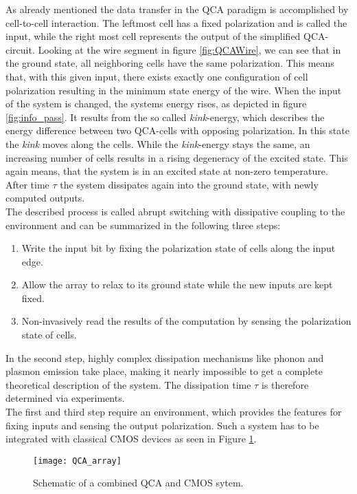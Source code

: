 As already mentioned the data transfer in the QCA paradigm is accomplished by cell-to-cell interaction. The leftmost cell has a fixed polarization and is called the input, while the right most cell represents the output of the simplified  QCA-circuit. Looking at the wire segment in figure \ref{fig:QCAWire}, we can see that in the ground state, all neighboring cells have the same polarization. This means that, with this given input, there exists exactly one configuration of cell polarization resulting in the minimum state energy of the wire. When the input of the system is changed, the systems energy rises, as depicted in figure \ref{fig:info_pass}. It results from the so called \textit{kink}-energy, which describes the energy difference between two QCA-cells with opposing polarization. In this state the \textit{kink} moves along the cells. While the \textit{kink}-energy stays the same, an increasing number of cells results in a rising degeneracy of the excited state. This again means, that the system is in an excited state at non-zero temperature. After time $\tau$ the system dissipates again into the ground state, with newly computed outputs.\\

The described process is called abrupt switching with dissipative coupling to the environment and can be summarized in the following three steps:
\begin{enumerate}
	\item Write the input bit by fixing the polarization state of
	cells along the input edge.
	\item Allow the array to relax to its ground state while the
	new inputs are kept fixed.
	\item Non-invasively read the results of the computation
	by sensing the polarization state of cells.
\end{enumerate}

In the second step, highly complex dissipation mechanisms like phonon and plasmon emission take place, making it nearly impossible to get a complete theoretical description of the system. The dissipation time $\tau$ is therefore determined via experiments.\\
The first and third step require an environment, which provides the features for fixing inputs and sensing the output polarization. Such a system has to be integrated with classical CMOS devices as seen in Figure \ref{fig:QCA_array}.\\

\begin{figure}
	\centering
	\texttt{[image: QCA\_array]}
	\caption{Schematic of a combined QCA and CMOS sytem.} 
	\label{fig:QCA_array}
\end{figure}

